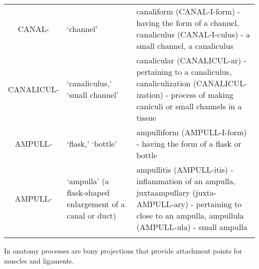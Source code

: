 \begin{longtable}{c | p{} | p{}}
        CANAL- & `channel' & canaliform (CANAL-I-form) - having the form of a channel, canaliculus  (CANAL-I-culus) - a small channel, a canaliculus \\
        CANALICUL- & `canaliculus,' `small channel' & canalicular (CANALICUL-ar) - pertaining to a canaliculus, canaliculization (CANALICUL-ization) - process of making caniculi or small channels in a tissue \\
        AMPULL- & `flask,' `bottle' & ampulliform (AMPULL-I-form) - having the form of a flask or bottle \\
        AMPULL- & `ampulla' (a flask-shaped enlargement of a canal or duct) & ampullitis (AMPULL-itis) - inflammation of an ampulla, juxtaampullary (juxta-AMPULL-ary) - pertaining to close to an ampulla, ampullula (AMPULL-ula) - small ampulla \\
    \label{tab:Ch6Base}
\end{longtable}

In anatomy processes are bony projections that provide attachment points for muscles and ligaments.


